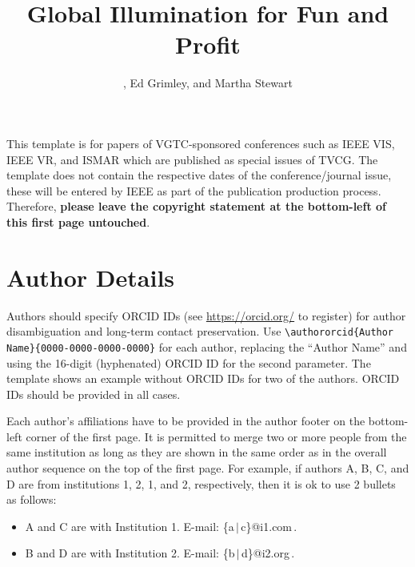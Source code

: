\documentclass[journal]{vgtc}                     %
\title{Global Illumination for Fun and Profit}
\author{%
  \authororcid{Josiah S.\ Carberry}{0000-0002-1825-0097},
  Ed Grimley, and 
  Martha Stewart
}
\begin{document}


\maketitle


This template is for papers of VGTC-sponsored conferences such as IEEE VIS, IEEE VR, and ISMAR which are published as special issues of TVCG.
The template does not contain the respective dates of the conference/journal issue, these will be entered by IEEE as part of the publication production process.
Therefore, \textbf{please leave the copyright statement at the bottom-left of this first page untouched}.


\section{Author Details}

Authors should specify ORCID IDs (see \url{https://orcid.org/}  to register) for author disambiguation and long-term contact preservation.
Use \verb|\authororcid{Author Name}{0000-0000-0000-0000}| for each author, replacing the ``Author Name'' and using the 16-digit (hyphenated) ORCID ID for the second parameter.
The template shows an example without ORCID IDs for two of the authors.
ORCID IDs should be provided in all cases.

Each author's affiliations have to be provided in the author footer on the bottom-left corner of the first page.
It is permitted to merge two or more people from the same institution as long as they are shown in the same order as in the overall author sequence on the top of the first page.
For example, if authors A, B, C, and D are from institutions 1, 2, 1, and 2, respectively, then it is ok to use 2 bullets as follows:
\begin{itemize}
  \item A and C are with Institution 1. E-mail: \{a\,$|$\,c\}@i1.com\,.

  \item B and D are with Institution 2. E-mail: \{b\,$|$\,d\}@i2.org\,.
\end{itemize}
\end{document}
